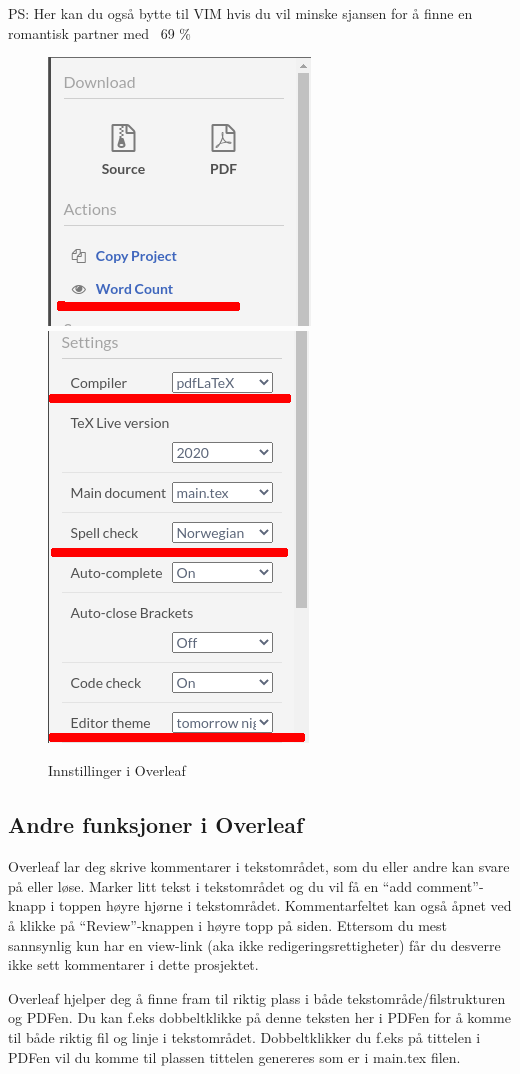     {\tiny PS: Her kan du også bytte til VIM hvis du vil minske sjansen for å finne en romantisk partner med ~69 \%}
    
    \begin{figure}[H]
        \centering
        \includegraphics[width=.4\textwidth]{bilder/overleaf-2.png}
        \includegraphics[width=.4\textwidth]{bilder/overleaf-3.png}
        \caption{Innstillinger i Overleaf}
        \label{fig:innstillinger-overleaf}
    \end{figure}
    
    \subsection{Andre funksjoner i Overleaf}
        Overleaf lar deg skrive kommentarer i tekstområdet, som du eller andre kan svare på eller løse. Marker litt tekst i tekstområdet og du vil få en ``add comment''-knapp i toppen høyre hjørne i tekstområdet. Kommentarfeltet kan også åpnet ved å klikke på ``Review''-knappen i høyre topp på siden. Ettersom du mest sannsynlig kun har en view-link (aka ikke redigeringsrettigheter) får du desverre ikke sett kommentarer i dette prosjektet.

        Overleaf hjelper deg å finne fram til riktig plass i både tekstområde/filstrukturen og PDFen.
        Du kan f.eks dobbeltklikke på denne teksten her i PDFen for å komme til både riktig fil og linje i tekstområdet. Dobbeltklikker du f.eks på tittelen i PDFen vil du komme til plassen tittelen genereres som er i main.tex filen. 
        
